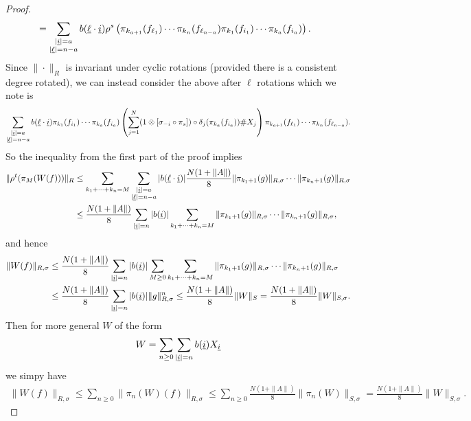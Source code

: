 \begin{proof}
\begin{align*}
		 &= \sum_{\substack{|\underline{i}|=a\\ |\underline{\ell}|=n-a}} b(\underline{\ell}\cdot \underline{i}) \rho^s\left(\pi_{k_{a+1}}(f_{\ell_1})\cdots \pi_{k_n}(f_{\ell_{n-a}}) \pi_{k_1}(f_{i_1})\cdots \pi_{k_a}(f_{i_a})\right).
	\end{align*}
Since $\|\cdot\|_R$ is invariant under cyclic rotations (provided there is a consistent degree rotated), we can instead consider the above after $\ell$ rotations which we note is
	\begin{align*}
		\sum_{\substack{|\underline{i}|=a\\ |\underline{\ell}|=n-a}} b(\underline{\ell}\cdot \underline{i})\pi_{k_1}(f_{i_1})\cdots \pi_{k_a}(f_{i_a}) \left( \sum_{j=1}^N (1\otimes[\sigma_{-i}\circ\pi_s])\circ\delta_j(\pi_{k_a}(f_{i_a}))\# X_j\right)\pi_{k_{a+1}}(f_{\ell_1}) \cdots \pi_{k_n}(f_{\ell_{n-a}}).
	\end{align*}
So the inequality from the first part of the proof implies
	\begin{align*}
		\|\rho^t(\pi_M(W(f)))\|_R &\leq \sum_{k_1+\cdots +k_n=M}\sum_{\substack{|\underline{i}|=a\\ |\underline{\ell}|=n-a}} |b(\underline{\ell}\cdot \underline{i})| \frac{N(1+\|A\|)}{8} \| \pi_{k_1+1}(g)\|_{R,\sigma}\cdots \|\pi_{k_n+1}(g)\|_{R,\sigma}\\
			& \leq \frac{N(1+\|A\|)}{8}\sum_{|\underline{i}|=n} |b(\underline{i})| \sum_{k_1+\cdots +k_n=M}\| \pi_{k_1+1}(g)\|_{R,\sigma}\cdots \|\pi_{k_n+1}(g)\|_{R,\sigma},
	\end{align*}
and hence
	\begin{align*}
		\|W(f)\|_{R,\sigma} &\leq \frac{N(1+\|A\|)}{8}\sum_{|\underline{i}|=n} |b(\underline{i})| \sum_{M\geq 0}\sum_{k_1+\cdots +k_n=M}\| \pi_{k_1+1}(g)\|_{R,\sigma}\cdots \|\pi_{k_n+1}(g)\|_{R,\sigma}\\
			&\leq \frac{N(1+\|A\|)}{8}\sum_{|\underline{i}|=n} |b(\underline{i})| \|g\|_{R,\sigma}^n \leq \frac{N(1+\|A\|)}{8}\|W\|_S=\frac{N(1+\|A\|)}{8}\|W\|_{S,\sigma}.
	\end{align*}
Then for more general $W$ of the form
	\begin{align*}
		W=\sum_{n\geq 0} \sum_{|\underline{i}|=n} b(\underline{i}) X_{\underline{i}}
	\end{align*}
we simpy have
	\begin{align*}
		\|W(f)\|_{R,\sigma} \leq \sum_{n\geq 0} \| \pi_n(W)(f)\|_{R,\sigma} \leq \sum_{n\geq 0} \frac{N(1+\|A\|)}{8} \|\pi_n(W)\|_{S,\sigma} = \frac{N(1+\|A\|)}{8} \|W\|_{S,\sigma}.
	\end{align*}


\end{proof}
